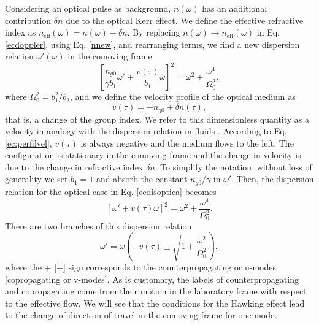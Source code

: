 \documentclass[aps,pra,reprint,amsmath,amssymb,showpacs,groupedaddress,floatfix]{revtex4-1}
\begin{document}
Considering an optical pulse as background, $n(\omega)$ has an additional contribution $\delta n$ due to the optical Kerr effect. We define the effective refractive index as $n_\text{eff}(\omega)=n(\omega)+\delta n$. By replacing $n(\omega)\rightarrow n_\text{eff}(\omega)$ in Eq. \eqref{ecdoppler}, using Eq. \eqref{nnew}, and rearranging terms, we find a new dispersion relation $\omega'(\omega)$ in the comoving frame
\begin{equation}\label{ecdisoptica}
\left[\frac{n_{g0}}{\gamma b_1}\omega'+\frac{v(\tau)}{b_1}\omega\right]^2=\omega^2+\frac{\omega^4}{\Omega_0^2},
\end{equation}
where $\Omega^2_0=b_1^2/b_2$, and we define the velocity profile of the optical medium as
\begin{equation}\label{ec:perfilvel}
v(\tau)=-n_{g0}+\delta n(\tau),
\end{equation}
that is, a change of the group index. We refer to this dimensionless quantity as a velocity in analogy with the dispersion relation in fluids \cite{Corley1999}. According to Eq. \eqref{ec:perfilvel}, $v(\tau)$ is always negative and the medium flows to the left. The configuration is stationary in the comoving frame and the change in velocity is due to the change in refractive index $\delta n$.
To simplify the notation, without loss of generality we set $b_1=1$ and absorb the constant $n_{g0}/\gamma$ in $\omega'$. Then, the dispersion relation for the optical case in Eq. \eqref{ecdisoptica} becomes
\begin{equation}\label{disperoptica}
\left[\omega'+v(\tau)\omega\right]^2=\omega^2+\frac{\omega^4}{\Omega_0^2}.
\end{equation}
There are two branches of this dispersion relation
\begin{equation}
\omega'=\omega\left(-v(\tau)\pm\sqrt{1+\frac{\omega^2}{\Omega_0^2}}\right),
\end{equation}
where the $+$ [$-$] sign corresponds to the counterpropagating or u-modes [copropagating or v-modes]. As is customary, the labels of counterpropagating and copropagating come from their motion in the laboratory frame with respect to the effective flow. We will see that the conditions for the Hawking effect lead to the change of direction of travel in the comoving frame for one mode.
\end{document}
